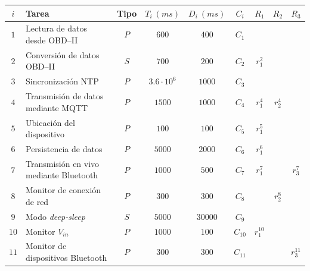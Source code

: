 \begin{table}[H]
  \centering
  \begin{tabularx}{\linewidth}{c|X|c|c|c|c|c|c|c}
    $i$  & \textbf{Tarea}                         & \textbf{Tipo} & $T_i~\left(ms\right)$ & $D_i~\left(ms\right)$ & $C_i$    & $R_1$      & $R_2$   & $R_3$      \\
    \hline\hline
    $1$  & Lectura de datos desde \ac{OBD}--II    & $P$           & $600$                 & $400$                 & $C_1$    &            &         &            \\
    $2$  & Conversión de datos \ac{OBD}--II       & $S$           & $700$                 & $200$                 & $C_2$    & $r^2_1$    &         &            \\
    $3$  & Sincronización NTP                     & $P$           & $3.6 \cdot 10^6$      & $1000$                & $C_3$    &            &         &            \\
    $4$  & Transmisión de datos mediante MQTT     & $P$           & $1500$                & $1000$                & $C_4$    & $r^4_1$    & $r^4_2$ &            \\
    $5$  & Ubicación del dispositivo              & $P$           & $100$                 & $100$                 & $C_5$    & $r^5_1$    &         &            \\
    $6$  & Persistencia de datos                  & $P$           & $5000$                & $2000$                & $C_6$    & $r^6_1$    &         &            \\
    $7$  & Transmisión en vivo mediante Bluetooth & $P$           & $1000$                & $500$                 & $C_7$    & $r^7_1$    &         & $r^7_3$    \\
    $8$  & Monitor de conexión de red             & $P$           & $300$                 & $300$                 & $C_8$    &            & $r^8_2$ &            \\
    $9$  & Modo \textit{deep-sleep}               & $S$           & $5000$                & $30000$               & $C_9$    &            &         &            \\
    $10$ & Monitor $V_{in}$                       & $P$           & $1000$                & $100$                 & $C_{10}$ & $r^{10}_1$ &         &            \\
    $11$ & Monitor de dispositivos Bluetooth      & $P$           & $300$                 & $300$                 & $C_{11}$ &            &         & $r^{11}_3$ \\
    \hline
  \end{tabularx}
\end{table}

